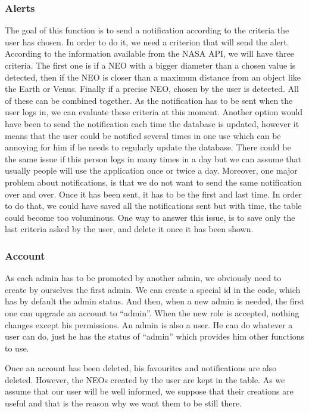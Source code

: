 \subsubsection{Alerts}

The goal of this function is to send a notification according to the criteria the user has chosen. In order to do it, we need a criterion that will send the alert. According to the information available from the NASA API, we will have three criteria. The first one is if a NEO with a bigger diameter than a chosen value is detected, then if the NEO is closer than a maximum distance from an object like the Earth or Venus. Finally if a precise NEO, chosen by the user is detected. All of these can be combined together.
As the notification has to be sent when the user logs in, we can evaluate these criteria at this moment. Another option would have been to send the notification each time the database is updated, however it means that the user could be notified several times in one use which can be annoying for him if he needs to regularly update the database. There could be the same issue if this person logs in many times in a day but we can assume that usually people will use the application once or twice a day.
Moreover, one major problem about notifications, is that we do not want to send the same notification over and over. Once it has been sent, it has to be the first and last time. In order to do that, we could have saved all the notifications sent but with time, the table could become too voluminous. One way to answer this issue, is to save only the last criteria asked by the user, and delete it once it has been shown.

\subsubsection{Account}

As each admin has to be promoted by another admin, we obviously need to create by ourselves the first admin.  We can create a special id in the code, which has by default the admin status. And then, when a new admin is needed, the first one can upgrade an account to “admin”. When the new role is accepted, nothing changes except his permissions. An admin is also a user. He can do whatever a user can do, just he has the status of “admin” which provides him other functions to use.



Once an account has been deleted, his favourites and notifications are also deleted. However, the NEOs created by the user are kept in the table. As we assume that our user will be well informed, we suppose that their creations are useful and that is the reason why we want them to be still there.

